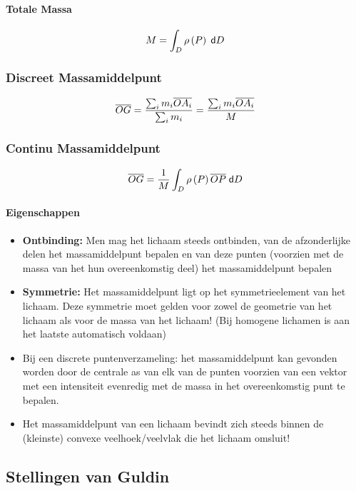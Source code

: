     \paragraph{Totale Massa}
    \label{sec:totaleMassa}
      \[
        M = \int_D \rho \left( P \right) \;\textsf{d}D
      \]
  \subsubsection{Discreet Massamiddelpunt}
  \label{sec:DiscreetMassamiddelpunt}
    \[
      \overline{OG} = \frac{\sum_i m_i \overline{OA_i}}{\sum_i m_i}
                    = \frac{\sum_i m_i \overline{OA_i}}{M}
    \]
  \subsubsection{Continu Massamiddelpunt}
  \label{sec:ContinuMassamiddelpunt}
    \[
      \overline{OG} = \frac{1}{M} \int_D \rho \left( P \right) \overline{OP} \;\textsf{d}D
    \]
  \paragraph{Eigenschappen}
    \begin{itemize}
      \item \textbf{Ontbinding:} 
            Men mag het lichaam steeds ontbinden, van de afzonderlijke delen het massamiddelpunt 
            bepalen en van deze punten (voorzien met de massa van het hun overeenkomstig deel) het massamiddelpunt bepalen
      \item \textbf{Symmetrie:} 
            Het massamiddelpunt ligt op het symmetrieelement van het lichaam. 
            Deze symmetrie moet gelden voor zowel de geometrie van het lichaam als 
            voor de massa van het lichaam! (Bij homogene lichamen is aan het laatste automatisch voldaan)
      \item Bij een discrete puntenverzameling:
            het massamiddelpunt kan gevonden worden door de centrale as van elk van de punten 
            voorzien van een vektor met een intensiteit evenredig met de massa in het overeenkomstig punt te bepalen.
      \item Het massamiddelpunt van een lichaam bevindt zich steeds binnen de (kleinste) convexe veelhoek/veelvlak die het lichaam omsluit!
    \end{itemize}
\subsection{Stellingen van Guldin}
\label{sec:StellingenVanGuldin}
